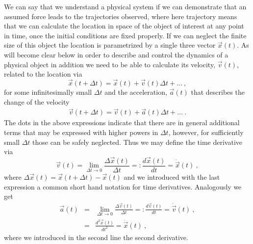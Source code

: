 \documentclass[12pt]{iopart}
\begin{document}
We can say that we understand a physical system if we can demonstrate that an assumed force leads to the trajectories
observed, where here trajectory means that we can calculate the location in space of the object of interest at any point
in time, once the initial conditions are fixed properly. If we can neglect the finite size of this object the location is parametrized
by a single three vector $\vec x(t)$. As will become clear below in order to describe and control the dynamics of a physical
object in addition we need to be able to calculate its velocity, $\vec v(t)$, related to the location via
\begin{equation}\label{eq:x_update}
\vec x(t+\Delta t) = \vec x(t) + \vec v(t) \Delta t + ... \ , \label{eq:vdef}
\end{equation}
for some infinitesimally small $\Delta t$ and the acceleration, $\vec a(t)$ that describes the change of the velocity
\begin{eqnarray}\label{eq:v_update}
\vec v(t+\Delta t) = \vec v(t) + \vec a(t) \Delta t + ...\ . \label{eq:adef}
\end{eqnarray}
The dots in the above expressions indicate that there are in general additional terms that may be expressed with
higher powers in $\Delta t$, however, for sufficiently small $\Delta t$ those can be safely neglected.
Thus we may define the time derivative via
\begin{equation}
\vec v(t) = \lim_{\Delta t\to 0} \frac{\Delta \vec x(t)}{\Delta t} =: \frac{d\vec x(t)}{dt}  = \dot{\vec  x}(t) \ ,
\end{equation}
where $\Delta \vec x(t)=\vec x(t+\Delta t)-\vec x(t)$ and we introduced with the last expression a common short hand notation
for time derivatives. Analogously we get
\begin{eqnarray}
\vec a(t) &=& \lim_{\Delta t\to 0} \frac{\Delta \vec v(t)}{\Delta t} =: \frac{d\vec v(t)}{dt}  = \dot{\vec v}(t) \ , \\
 &=& \frac{d^2\vec x(t)}{dt^2}  = \ddot{\vec x}(t) \ ,
\end{eqnarray}
where we introduced in the second line the second derivative.
\end{document}
